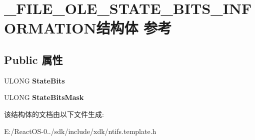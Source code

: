 \hypertarget{struct___f_i_l_e___o_l_e___s_t_a_t_e___b_i_t_s___i_n_f_o_r_m_a_t_i_o_n}{}\section{\+\_\+\+F\+I\+L\+E\+\_\+\+O\+L\+E\+\_\+\+S\+T\+A\+T\+E\+\_\+\+B\+I\+T\+S\+\_\+\+I\+N\+F\+O\+R\+M\+A\+T\+I\+O\+N结构体 参考}
\label{struct___f_i_l_e___o_l_e___s_t_a_t_e___b_i_t_s___i_n_f_o_r_m_a_t_i_o_n}
\subsection*{Public 属性}
\begin{DoxyCompactItemize}
\item 
\mbox{\label{struct___f_i_l_e___o_l_e___s_t_a_t_e___b_i_t_s___i_n_f_o_r_m_a_t_i_o_n_a9cc2f8a4bd775ae08389713f527c5daf}} 
U\+L\+O\+NG {\bfseries State\+Bits}
\item 
\mbox{\label{struct___f_i_l_e___o_l_e___s_t_a_t_e___b_i_t_s___i_n_f_o_r_m_a_t_i_o_n_a1fb12899016ec9c121fcec9583f7ad4c}} 
U\+L\+O\+NG {\bfseries State\+Bits\+Mask}
\end{DoxyCompactItemize}


该结构体的文档由以下文件生成\+:\begin{DoxyCompactItemize}
\item 
E\+:/\+React\+O\+S-\/0../sdk/include/xdk/ntifs.\+template.\+h\end{DoxyCompactItemize}
